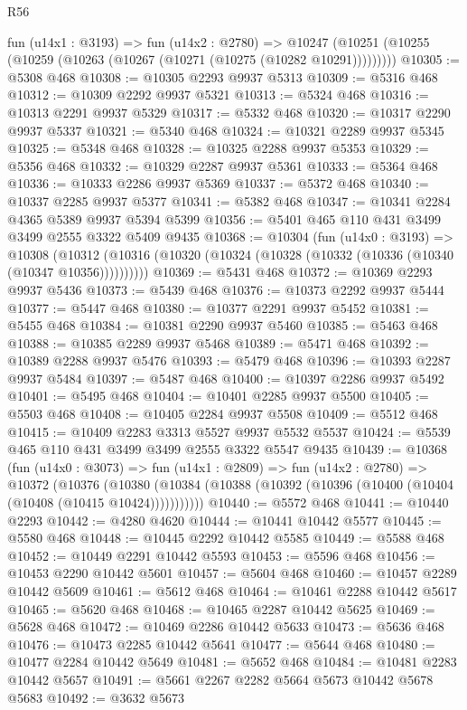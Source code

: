 \begin{lexlean}{R56}
\begin{coremodule}
    fun (u14x1 : @3193) =>
    fun (u14x2 : @2780) =>
    @10247 (@10251 (@10255 (@10259 (@10263 (@10267 (@10271 (@10275 (@10282 @10291)))))))))
@10305 := @5308 @468
@10308 := @10305 @2293 @9937 @5313
@10309 := @5316 @468
@10312 := @10309 @2292 @9937 @5321
@10313 := @5324 @468
@10316 := @10313 @2291 @9937 @5329
@10317 := @5332 @468
@10320 := @10317 @2290 @9937 @5337
@10321 := @5340 @468
@10324 := @10321 @2289 @9937 @5345
@10325 := @5348 @468
@10328 := @10325 @2288 @9937 @5353
@10329 := @5356 @468
@10332 := @10329 @2287 @9937 @5361
@10333 := @5364 @468
@10336 := @10333 @2286 @9937 @5369
@10337 := @5372 @468
@10340 := @10337 @2285 @9937 @5377
@10341 := @5382 @468
@10347 := @10341 @2284 @4365 @5389 @9937 @5394 @5399
@10356 := @5401 @465 @110 @431 @3499 @3499 @2555 @3322 @5409 @9435
@10368 := @10304
    (fun (u14x0 : @3193) =>
    @10308 (@10312 (@10316 (@10320 (@10324 (@10328 (@10332 (@10336 (@10340 (@10347 @10356))))))))))
@10369 := @5431 @468
@10372 := @10369 @2293 @9937 @5436
@10373 := @5439 @468
@10376 := @10373 @2292 @9937 @5444
@10377 := @5447 @468
@10380 := @10377 @2291 @9937 @5452
@10381 := @5455 @468
@10384 := @10381 @2290 @9937 @5460
@10385 := @5463 @468
@10388 := @10385 @2289 @9937 @5468
@10389 := @5471 @468
@10392 := @10389 @2288 @9937 @5476
@10393 := @5479 @468
@10396 := @10393 @2287 @9937 @5484
@10397 := @5487 @468
@10400 := @10397 @2286 @9937 @5492
@10401 := @5495 @468
@10404 := @10401 @2285 @9937 @5500
@10405 := @5503 @468
@10408 := @10405 @2284 @9937 @5508
@10409 := @5512 @468
@10415 := @10409 @2283 @3313 @5527 @9937 @5532 @5537
@10424 := @5539 @465 @110 @431 @3499 @3499 @2555 @3322 @5547 @9435
@10439 := @10368
    (fun (u14x0 : @3073) =>
    fun (u14x1 : @2809) =>
    fun (u14x2 : @2780) =>
    @10372
      (@10376
        (@10380 (@10384 (@10388 (@10392 (@10396 (@10400 (@10404 (@10408 (@10415 @10424)))))))))))
@10440 := @5572 @468
@10441 := @10440 @2293
@10442 := @4280 @4620
@10444 := @10441 @10442 @5577
@10445 := @5580 @468
@10448 := @10445 @2292 @10442 @5585
@10449 := @5588 @468
@10452 := @10449 @2291 @10442 @5593
@10453 := @5596 @468
@10456 := @10453 @2290 @10442 @5601
@10457 := @5604 @468
@10460 := @10457 @2289 @10442 @5609
@10461 := @5612 @468
@10464 := @10461 @2288 @10442 @5617
@10465 := @5620 @468
@10468 := @10465 @2287 @10442 @5625
@10469 := @5628 @468
@10472 := @10469 @2286 @10442 @5633
@10473 := @5636 @468
@10476 := @10473 @2285 @10442 @5641
@10477 := @5644 @468
@10480 := @10477 @2284 @10442 @5649
@10481 := @5652 @468
@10484 := @10481 @2283 @10442 @5657
@10491 := @5661 @2267 @2282 @5664 @5673 @10442 @5678 @5683
@10492 := @3632 @5673

\end{coremodule}
\end{lexlean}

